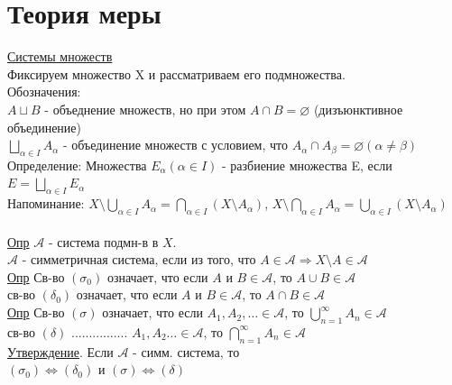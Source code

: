 \documentclass{article}
\begin{document}
\section{Теория меры}
\underline{Системы множеств} \\
Фиксируем множество X и рассматриваем его подмножества. \\
Обозначения: \\
$A \sqcup B$ - объеднение множеств, но при этом $A \cap B = \varnothing  $ (дизъюнктивное объединение) \\
$\bigsqcup_{\alpha \in I} A_\alpha$ - объединение множеств с условием, что $A_\alpha \cap A_\beta = \varnothing (\alpha \ne \beta)$ \\
Определение: Множества $E_\alpha (\alpha \in I)$ - разбиение множества E, если $E = \bigsqcup_{\alpha \in I} E_\alpha$ \\
Напоминание: $X \setminus \bigcup _{\alpha \in I} A_\alpha = \bigcap_{\alpha \in I} (X \setminus A_\alpha)$, $X \setminus \bigcap _{\alpha \in I} A_\alpha = \bigcup_{\alpha \in I} (X \setminus A_\alpha)$ \\
\\
\underline{Опр} $\mathcal{A}$ - система подмн-в в $X$. \\
\hspace*{1cm} $\mathcal{A}$ - симметричная система, если из того, что $A \in \mathcal{A} \Rightarrow X \setminus A \in \mathcal{A}$ \\
\underline{Опр} Св-во $(\sigma_0)$ означает, что \hspace*{0.5cm} если $A$ и $B \in \mathcal{A}$, то $A \cup B \in \mathcal{A}$ \\
\hspace*{1.1cm} св-во $(\delta_0)$ означает, что \hspace*{0.5cm} если $A$ и $B \in \mathcal{A}$, то $A \cap B \in \mathcal{A}$ \\
\underline{Опр} Св-во $(\sigma)$ означает, что \hspace*{0.5cm} если $A_1, A_2, \dots \in \mathcal{A}$, то $\bigcup_{n=1}^{\infty} A_n \in \mathcal{A}$ \\
\hspace*{1.1cm} св-во $(\delta)$ ................ \hspace*{1.8cm} $A_1, A_2 \dots \in \mathcal{A}$, то $\bigcap_{n=1}^{\infty} A_n \in \mathcal{A}$ \\
\underline{Утверждение}. Если $\mathcal{A}$ - симм. система, то \\
\hspace*{3cm} $(\sigma_0) \Leftrightarrow (\delta_0)$ и $(\sigma) \Leftrightarrow (\delta)$ \\
\end{document}
